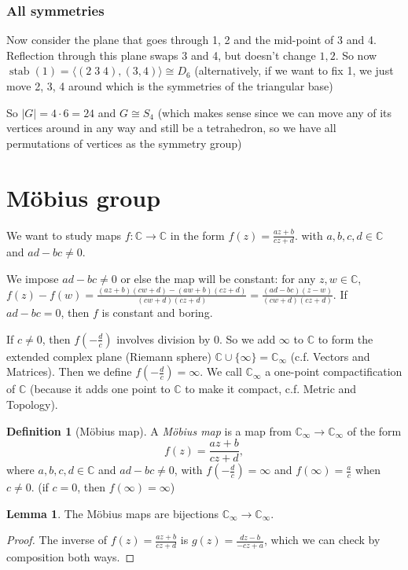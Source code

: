 \documentclass[a4paper]{article}
\theoremstyle{definition}
\newtheorem*{defi}{Definition}
\newtheorem*{lemma}{Lemma}
\newcommand{\C}{\mathbb{C}}
\newcommand{\bra}{\langle}
\newcommand{\ket}{\rangle}
\let\stdsection\section
\renewcommand\section{\newpage\stdsection}
\DeclareMathOperator\stab{stab}
\begin{document}
\subsubsection{All symmetries}
Now consider the plane that goes through 1, 2 and the mid-point of 3 and 4. Reflection through this plane swaps 3 and 4, but doesn't change $1, 2$. So now $\stab(1) = \bra (2\; 3\; 4), (3, 4)\ket \cong D_6$ (alternatively, if we want to fix 1, we just move 2, 3, 4 around which is the symmetries of the triangular base)

So $|G| = 4\cdot 6 = 24$ and $G\cong S_4$ (which makes sense since we can move any of its vertices around in any way and still be a tetrahedron, so we have all permutations of vertices as the symmetry group)

\section{M\"obius group}
We want to study maps $f: \C \to \C$ in the form $f(z) = \frac{az + b}{cz + d}$. with $a, b, c, d\in \C$ and $ad - bc \not= 0$.

We impose $ad - bc\not= 0$ or else the map will be constant: for any $z, w\in \C$, $f(z) - f(w) = \frac{(az + b)(cw + d) - (aw + b)(cz + d)}{(cw + d)(cz + d)} = \frac{(ad - bc)(z - w)}{(cw + d)(cz + d)}$. If $ad - bc = 0$, then $f$ is constant and boring.

If $c\not=0$, then $f(-\frac{d}{c})$ involves division by 0. So we add $\infty$ to $\C$ to form the extended complex plane (Riemann sphere) $\C\cup \{\infty\}= \C_\infty$ (c.f. Vectors and Matrices). Then we define $f(-\frac{d}{c}) = \infty$. We call $\C_\infty$ a one-point compactification of $\C$ (because it adds one point to $\C$ to make it compact, c.f. Metric and Topology).

\begin{defi}[M\"obius map]
  A \emph{M\"obius map} is a map from $\C_\infty \to \C_\infty$ of the form
  \[
  f(z) = \frac{az + b}{cz + d},
  \]
where $a, b, c, d\in \C$ and $ad - bc\not= 0$, with $f(-\frac{d}{c}) = \infty$ and $f(\infty) = \frac{a}{c}$ when $c\not= 0$. (if $c = 0$, then $f(\infty)=\infty$)
\end{defi}

\begin{lemma}
  The M\"obius maps are bijections $\C_\infty \to \C_\infty$. 
\end{lemma}

\begin{proof}
  The inverse of $f(z) = \frac{az + b}{cz+ d}$ is $g(z) = \frac{dz - b}{-cz + a}$, which we can check by composition both ways.
\end{proof}
\end{document}
